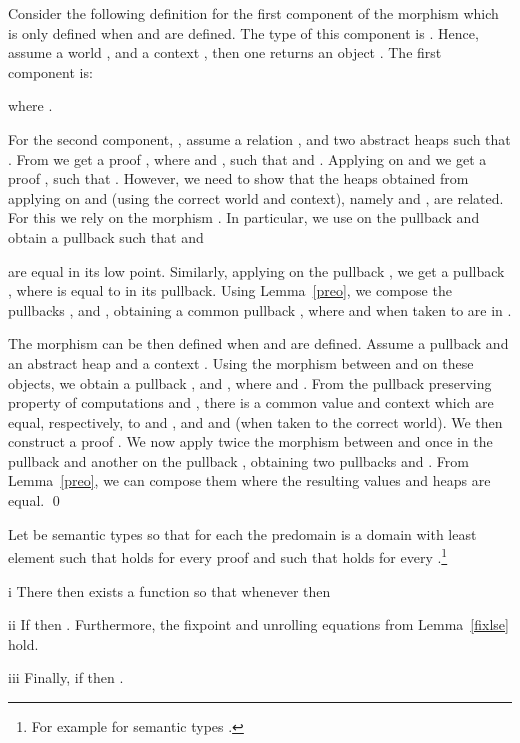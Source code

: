 \documentclass[orivec]{llncs}
\renewenvironment{proof}{\vspace{-1mm} \noindent {\bf Proof}\quad}{\qed}
\begin{document}
\begin{proof}
Consider the following definition for the first component of the morphism
 which is only defined when  and
 are defined. The type of this component is . Hence, assume a world , and a context , then one returns an object . The first component  is:

where .

For the second component, , assume a relation , and two abstract heaps 
such that . From  we get a 
proof , where
 and , such that  and . Applying  on  and
 we get a proof ,
such that . However,
we need to show that the heaps obtained from applying  on 
and  (using the correct world and context), namely 
and , are related. For this we rely on
the morphism . In particular,
we use  on the pullback  and
obtain a pullback  such that  and

are equal in its low point. Similarly, applying  on the
pullback , we get a pullback 
, where  is equal to
 in its pullback. Using Lemma~\ref{preo}, we compose the
pullbacks ,  and , obtaining a common pullback , where 
 and  when taken to  are in . 

The morphism  can be then defined when 
and  are defined.
Assume a pullback  and an abstract heap  and a context . Using the
morphism between  and  on these objects, we obtain a
pullback ,  and , where  and . 
From the pullback preserving property of computations and ,
there is a common value  and context
 which are equal, respectively, to
 and , and  and  (when taken to the
correct world). We then construct a
proof . We now apply twice the
morphism between  and  once in the pullback  and
another on the
pullback , obtaining two pullbacks
 and . From
Lemma~\ref{preo}, we can compose them where the resulting values and
heaps are equal.
\end{proof}
\begin{lemma}[fix]\label{fixlse}
  Let  be semantic types so that for each  the predomain
   is a domain with least element  such that
   holds for every proof  and such that  holds for every
  .\footnote{For example 
for semantic types .}
\begin{compactenum}
\item[i] There then exists a function
   so that whenever  then
  
\item[ii] If  then . Furthermore, the fixpoint and unrolling equations
  from Lemma~\ref{fixlse} hold. 
\item[iii] Finally, if  then
.    
\end{compactenum}
\end{lemma}
\end{document}
